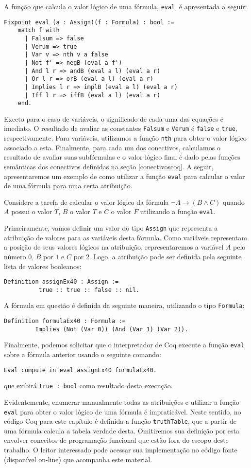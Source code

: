 A função que calcula o valor lógico de uma fórmula,
\texttt{eval}, é apresentada a seguir:
\begin{lstlisting}
Fixpoint eval (a : Assign)(f : Formula) : bool :=
    match f with
      | Falsum => false
      | Verum => true
      | Var v => nth v a false
      | Not f' => negB (eval a f')
      | And l r => andB (eval a l) (eval a r)
      | Or l r => orB (eval a l) (eval a r)
      | Implies l r => implB (eval a l) (eval a r)
      | Iff l r => iffB (eval a l) (eval a r)
    end.
\end{lstlisting}
Exceto para o caso de variáveis, o significado de cada uma das
equações é imediato. O resultado de avaliar as constantes \texttt{Falsum} e
\texttt{Verum} é \texttt{false} e \texttt{true}, respectivamente. Para
variáveis, utilizamos a função \texttt{nth} para obter o valor lógico
associado a esta. Finalmente, para cada um dos conectivos, calculamos
o resultado de avaliar suas subfórmulas e o valor lógico final é dado
pelas funções semânticas dos conectivos definidas na seção
\ref{conectivoscoq}. A seguir, apresentaremos um exemplo de como
utilizar a função \texttt{eval} para calcular o valor de uma fórmula
para uma certa atribuição.
\begin{Example}
Considere a tarefa de calcular o valor lógico da fórmula $\neg A \to (B
\land C)$ quando $A$ possui o valor $T$, $B$ o valor $T$ e $C$ o valor
$F$ utilizando a função \texttt{eval}.

Primeiramente, vamos definir um valor do tipo \texttt{Assign} que
representa a atribuição de valores para as variáveis desta fórmula.
Como variáveis representam a posição de seus valores lógicos na
atribuição, representaremos a variável $A$ pelo número $0$, $B$ por
$1$ e $C$ por $2$. Logo, a atribuição pode ser definida pela seguinte
lista de valores booleanos:
\begin{lstlisting}
Definition assignEx40 : Assign :=
          true :: true :: false :: nil.
\end{lstlisting}
A fórmula em questão é definida da seguinte maneira, utilizando o tipo
\texttt{Formula}:
\begin{lstlisting}
Definition formulaEx40 : Formula :=
         Implies (Not (Var 0)) (And (Var 1) (Var 2)).
\end{lstlisting}
Finalmente, podemos solicitar que o interpretador de Coq execute a
função \texttt{eval} sobre a fórmula anterior usando o seguinte
comando:
\begin{lstlisting}
Eval compute in eval assignEx40 formulaEx40.
\end{lstlisting}
que exibirá \texttt{true : bool} como resultado desta execução.
\end{Example}
Evidentemente, enumerar manualmente todas as atribuições e utilizar a
função \texttt{eval} para obter o valor lógico de uma fórmula é
impraticável. Neste sentido, no código Coq para este capítulo é
definida a função \texttt{truthTable}, que a partir de uma fórmula
calcula a tabela verdade desta. Omitiremos sua definição por esta
envolver conceitos de programação funcional que estão fora do escopo
deste trabalho. O leitor interessado pode acessar sua implementação no
código fonte (disponível on-line) que acompanha este material.


